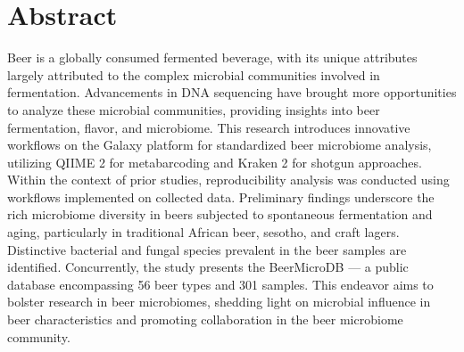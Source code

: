 \section*{Abstract}

Beer is a globally consumed fermented beverage, with its unique attributes largely attributed to the complex microbial communities involved in fermentation. Advancements in DNA sequencing have brought more opportunities to analyze these microbial communities, providing insights into beer fermentation, flavor, and microbiome. This research introduces innovative workflows on the Galaxy platform for standardized beer microbiome analysis, utilizing QIIME 2 for metabarcoding and Kraken 2 for shotgun approaches. Within the context of prior studies, reproducibility analysis was conducted using workflows implemented on collected data. Preliminary findings underscore the rich microbiome diversity in beers subjected to spontaneous fermentation and aging, particularly in traditional African beer, sesotho, and craft lagers. Distinctive bacterial and fungal species prevalent in the beer samples are identified. Concurrently, the study presents the BeerMicroDB — a public database encompassing 56 beer types and 301 samples. This endeavor aims to bolster research in beer microbiomes, shedding light on microbial influence in beer characteristics and promoting collaboration in the beer microbiome community.